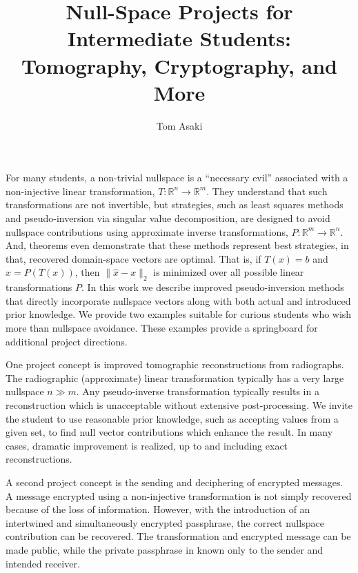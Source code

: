 \documentclass[a4paper]{amsart}
\date{}
\begin{document}
\title{Null-Space Projects for Intermediate Students: Tomography, Cryptography, and More}
\author{Tom Asaki} %
\address{Washington State University} %

\maketitle

For many students, a non-trivial nullspace is a ``necessary evil'' associated with a non-injective linear transformation, $T:\mathbb{R}^n\rightarrow\mathbb{R}^m$.  They understand that such transformations are not invertible, but strategies, such as least squares methods and pseudo-inversion via singular value decomposition, are designed to avoid nullspace contributions using approximate inverse transformations, $P:\mathbb{R}^m\rightarrow\mathbb{R}^n$.  And, theorems even demonstrate that these methods represent best strategies, in that, recovered domain-space vectors are optimal.  That is, if $T(x)=b$ and $\hat{x}=P(T(x))$, then $\|\hat{x}-x\|_2$ is minimized over all possible linear transformations $P$.  In this work we describe improved pseudo-inversion methods that directly incorporate nullspace vectors along with both actual and introduced prior knowledge.  We provide two examples suitable for curious students who wish more than nullspace avoidance.  These examples provide a springboard for additional project directions.

One project concept is improved tomographic reconstructions from radiographs.  The radiographic (approximate) linear transformation typically has a very large nullspace $n\gg m$.  Any pseudo-inverse transformation typically results in a reconstruction which is unacceptable without extensive post-processing.  We invite the student to use reasonable prior knowledge, such as accepting values from a given set, to find null vector contributions which enhance the result.  In many cases, dramatic improvement is realized, up to and including exact reconstructions.

A second project concept is the sending and deciphering of encrypted messages.  A message encrypted using a non-injective transformation is not simply recovered because of the loss of information.  However, with the introduction of an intertwined and simultaneously encrypted passphrase, the correct nullspace contribution can be recovered.  The transformation and encrypted message can be made public, while the private passphrase in known only to the sender and intended receiver.  
\end{document}
